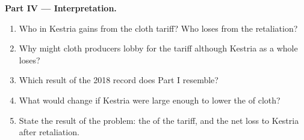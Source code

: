 \begin{problem}
\medskip
\noindent\textbf{Part IV --- Interpretation.}
\begin{enumerate}[resume]
\item Who in Kestria gains from the cloth tariff? Who loses from the retaliation?
\item Why might cloth producers lobby for the tariff although Kestria as a whole loses?
\item Which result of the 2018 record does Part I resemble?
\item What would change if Kestria were large enough to lower the  of cloth?
\item State the result of the problem: the  of the tariff, and the net loss to Kestria after retaliation.
\end{enumerate}
\end{problem}
